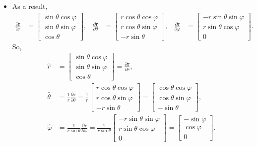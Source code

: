 \documentclass[10pt]{article}
\newcommand{\ve}[1]{\mathbf{#1}}
\begin{document}
\begin{itemize}
    \item As a result,
    \begin{align*}
      \frac{\partial \ve{r}}{\partial r} &= \begin{bmatrix}
        \sin \theta \cos \varphi \\
        \sin \theta \sin \varphi \\
        \cos \theta
      \end{bmatrix}, &
      \frac{\partial \ve{r}}{\partial \theta} &= \begin{bmatrix}
        r \cos \theta \cos \varphi \\
        r \cos \theta \sin \varphi \\
        -r \sin \theta
      \end{bmatrix}, &
      \frac{\partial \ve{r}}{\partial \varphi} &= \begin{bmatrix}
        -r \sin \theta \sin \varphi \\
        r \sin \theta \cos \varphi \\
        0
      \end{bmatrix}.
    \end{align*}
    So,  
    \begin{align*}
      \hat{r} &= \begin{bmatrix}
        \sin \theta \cos \varphi \\
        \sin \theta \sin \varphi \\
        \cos \theta
      \end{bmatrix}
      = \frac{\partial \ve{r}}{\partial r}, \\
      \hat\theta 
      &= \frac{1}{r}\frac{\partial \ve{r}}{\partial \theta}
      = \frac{1}{r} \begin{bmatrix}
        r \cos \theta \cos \varphi \\
        r \cos \theta \sin \varphi \\
        -r \sin \theta        
      \end{bmatrix}
      = \begin{bmatrix}
        \cos\theta\cos\varphi \\
        \cos\theta\sin\varphi \\
        -\sin\theta
      \end{bmatrix}, \\
      \hat\varphi 
      &= \frac{1}{r\sin\theta} \frac{\partial \ve{r}}{\partial \varphi}
      = \frac{1}{r \sin\theta}\begin{bmatrix}
        -r \sin \theta \sin \varphi \\
        r \sin \theta \cos \varphi \\
        0
      \end{bmatrix}
      = \begin{bmatrix}
        -\sin\varphi \\
        \cos\varphi \\
        0
      \end{bmatrix}.
    \end{align*}


\end{itemize}
\end{document}
